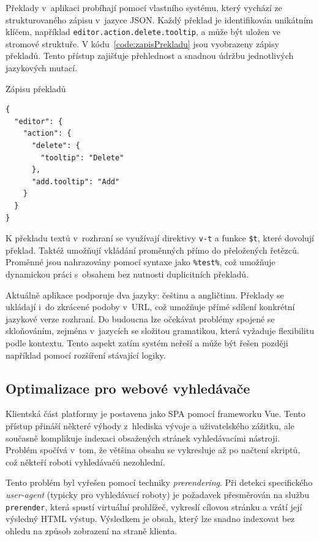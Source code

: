 Překlady v~aplikaci probíhají pomocí vlastního systému, který vychází ze strukturovaného zápisu v~jazyce JSON. 
Každý překlad je identifikován unikátním klíčem, například \texttt{editor.action.delete.tooltip}, a může být uložen ve stromové struktuře. 
V kódu~\ref{code:zapisPrekladu} jsou vyobrazeny zápisy překladů.
Tento přístup zajišťuje přehlednost a snadnou údržbu jednotlivých jazykových mutací.


\begin{listing}[ht!]
\caption{Zápisu překladů}\label{code:zapisPrekladu}
\begin{verbatim}
{
  "editor": {
    "action": {
      "delete": {
        "tooltip": "Delete"
      },
      "add.tooltip": "Add"
    }
  }
}
\end{verbatim}
\end{listing}

K překladu textů v~rozhraní se využívají direktivy \texttt{v-t} a funkce \texttt{\$t}, které dovolují překlad.
Taktéž umožňují vkládání proměnných přímo do přeložených řetězců. 
Proměnné jsou nahrazovány pomocí syntaxe jako \texttt{\%test\%}, což umožňuje dynamickou práci s~obsahem bez nutnosti duplicitních překladů.

Aktuálně aplikace podporuje dva jazyky: češtinu a angličtinu. 
Překlady se ukládají i~do zkrácené podoby v~URL, což umožňuje přímé sdílení konkrétní jazykové verze rozhraní. 
Do budoucna lze očekávat problémy spojené se skloňováním, zejména v~jazycích se složitou gramatikou, která vyžaduje flexibilitu podle kontextu. 
Tento aspekt zatím systém neřeší a může být řešen později například pomocí rozšíření stávající logiky.

\subsection{Optimalizace pro webové vyhledávače}

Klientská část platformy je postavena jako SPA pomocí frameworku Vue. 
Tento přístup přináší některé výhody z~hlediska vývoje a uživatelského zážitku, ale současně komplikuje indexaci obsažených stránek vyhledávacími nástroji. 
Problém spočívá v~tom, že většina obsahu se vykresluje až po načtení skriptů, což někteří roboti vyhledávačů nezohlední.

Tento problém byl vyřešen pomocí techniky \textit{prerendering}.
Při detekci specifického \textit{user-agent} (typicky pro vyhledávací roboty) je požadavek přesměrován na službu \texttt{prerender}, která spustí virtuální prohlížeč, vykreslí cílovou stránku a vrátí její výsledný HTML výstup.
Výsledkem je obsah, který lze snadno indexovat bez ohledu na způsob zobrazení na straně klienta.

